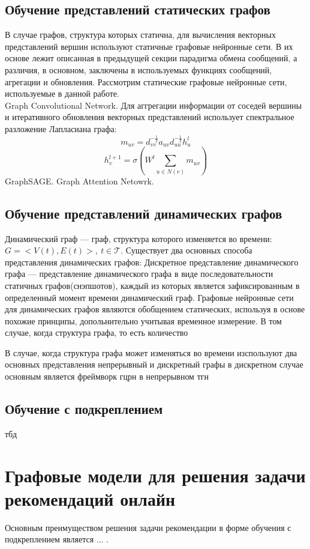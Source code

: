 \documentclass{mipt-thesis-ms}
\begin{document}
\section{Обучение представлений статических графов}
В случае графов, структура которых статична, для вычисления векторных представлений вершин используют статичные графовые нейронные сети. В их основе лежит описанная в предыдущей секции парадигма обмена сообщений, а различия, в основном, заключены в используемых функциях сообщений, агрегации и обновления. Рассмотрим статические графовые нейронные сети, используемые в данной работе.\\

Graph Convolutional Network. Для аггрегации информации от соседей вершины и итеративного обновления векторных представлений использует спектральное разложение Лапласиана графа:
$$m_{uv} = d_{vv}^{-\frac12}a_{uv}d_{uu}^{-\frac{1}{2}} h_u^l$$
$$h_v^{l+1} = \sigma\left(W^l \sum_{u \in N(v)}m_{uv}\right)$$ 
GraphSAGE.
Graph Attention Netowrk.

\section{Обучение представлений динамических графов}
Динамический граф --- граф, структура которого изменяется во времени: $G = <V(t), E(t)>,\: t \in \mathcal{T}$.
Существует два основных способа представления динамических графов:
Дискретное представление динамического графа --- представление динамического графа в виде последовательности статичных графов(снэпшотов), каждый из которых является зафиксированным в определенный момент времени динамический граф.
Графовые нейронные сети для динамических графов являются обобщением статических, используя в основе похожие принципы, допольнительно учитывая временное измерение.
В том случае, когда структура графа, то есть количество 

В случае, когда структура графа может изменяться во времени изспользуют два основных представления
непрерывный и дискретный графы
в дискретном случае основным является фреймворк гцрн
в непрерывном тгн

\section{Обучение с подкреплением}
тбд


\chapter{Графовые модели для решения задачи рекомендаций онлайн}
Основным преимуществом решения задачи рекомендации в форме обучения с подкреплением является ... .
\end{document}

